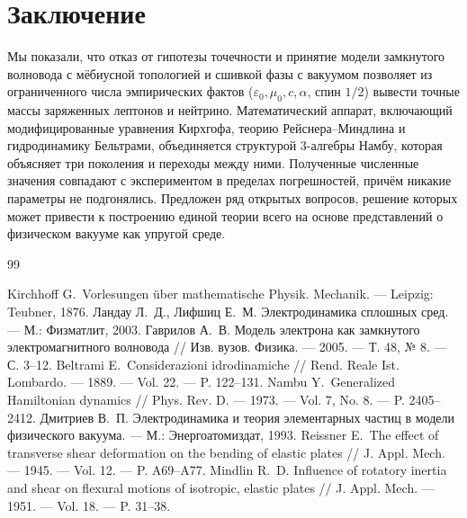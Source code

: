 \documentclass[12pt,a4paper]{article}
\begin{document}
	\section{Заключение}
	Мы показали, что отказ от гипотезы точечности и принятие модели замкнутого волновода с мёбиусной топологией и сшивкой фазы с вакуумом позволяет из ограниченного числа эмпирических фактов ($\varepsilon_0,\mu_0,c,\alpha$, спин $1/2$) вывести точные массы заряженных лептонов и нейтрино. Математический аппарат, включающий модифицированные уравнения Кирхгофа, теорию Рейснера–Миндлина и гидродинамику Бельтрами, объединяется структурой 3-алгебры Намбу, которая объясняет три поколения и переходы между ними. Полученные численные значения совпадают с экспериментом в пределах погрешностей, причём никакие параметры не подгонялись. Предложен ряд открытых вопросов, решение которых может привести к построению единой теории всего на основе представлений о физическом вакууме как упругой среде.
	
	\begin{thebibliography}{99}
		
		 Kirchhoff G.~Vorlesungen \"uber mathematische Physik. Mechanik. — Leipzig: Teubner, 1876.
		 Ландау Л.~Д., Лифшиц Е.~М. Электродинамика сплошных сред. — М.: Физматлит, 2003.
		 Гаврилов А.~В. Модель электрона как замкнутого электромагнитного волновода // Изв. вузов. Физика. — 2005. — Т. 48, № 8. — С. 3–12.
		 Beltrami E.~Considerazioni idrodinamiche // Rend. Reale Ist. Lombardo. — 1889. — Vol. 22. — P. 122–131.
		 Nambu Y.~Generalized Hamiltonian dynamics // Phys. Rev. D. — 1973. — Vol. 7, No. 8. — P. 2405–2412.
		 Дмитриев В.~П. Электродинамика и теория элементарных частиц в модели физического вакуума. — М.: Энергоатомиздат, 1993.
		 Reissner E.~The effect of transverse shear deformation on the bending of elastic plates // J. Appl. Mech. — 1945. — Vol. 12. — P. A69–A77.
		 Mindlin R.~D. Influence of rotatory inertia and shear on flexural motions of isotropic, elastic plates // J. Appl. Mech. — 1951. — Vol. 18. — P. 31–38.
		
	\end{thebibliography}
	
\end{document}
